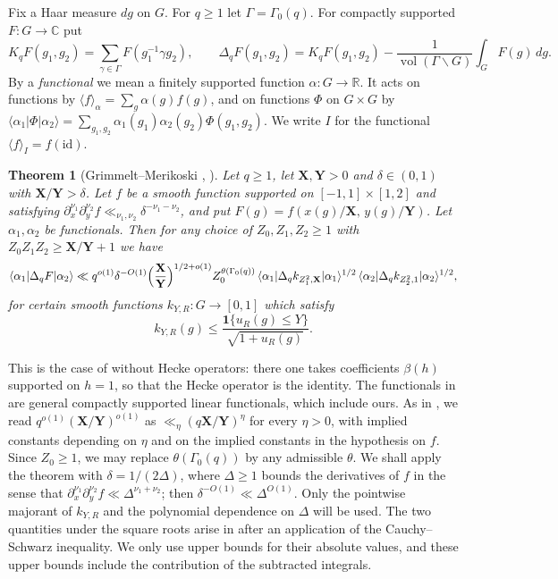 \documentclass[11pt]{amsart}
\newtheorem{theorem}{Theorem}[section]
\theoremstyle{remark}
\theoremstyle{definition}
\numberwithin{equation}{section}
\newcommand{\R}{\mathbb{R}}
\newcommand{\C}{\mathbb{C}}
\newcommand{\bX}{\mathbf{X}}
\newcommand{\bY}{\mathbf{Y}}
\newcommand{\vol}{\operatorname{vol}}
\newcommand{\one}{\mathbf{1}}
\newcommand{\br}[1]{\langle #1\rangle}
\begin{document}
Fix a Haar measure $dg$ on $G$. For $q\ge1$ let $\Gamma=\Gamma_0(q)$. For compactly supported $F:G\to\C$ put
\[
K_qF(g_1,g_2)=\sum_{\gamma\in\Gamma}F(g_1^{-1}\gamma g_2),\qquad\Delta_qF(g_1,g_2)=K_qF(g_1,g_2)-\frac{1}{\vol(\Gamma\backslash G)}\int_GF(g)\,dg.
\]
By a \emph{functional} we mean a finitely supported function $\alpha:G\to\R$. It acts on functions by $\br{f}_\alpha=\sum_g\alpha(g)f(g)$, and on functions $\Phi$ on $G\times G$ by $\br{\alpha_1|\Phi|\alpha_2}=\sum_{g_1,g_2}\alpha_1(g_1)\alpha_2(g_2)\Phi(g_1,g_2)$. We write $I$ for the functional $\br{f}_I=f(\mathrm{id})$.

\begin{theorem}[Grimmelt--Merikoski {\cite[Theorem~2.1]{GM}}, {\cite[Theorem~8.1]{GM1}}]\label{thm:GM}
Let $q\ge1$, let $\bX,\bY>0$ and $\delta\in(0,1)$ with $\bX/\bY>\delta$. Let $f$ be a smooth function supported on $[-1,1]\times[1,2]$ and satisfying $\partial_x^{\nu_1}\partial_y^{\nu_2}f\ll_{\nu_1,\nu_2}\delta^{-\nu_1-\nu_2}$, and put $F(g)=f(x(g)/\bX,\,y(g)/\bY)$. Let $\alpha_1,\alpha_2$ be functionals. Then for any choice of $Z_0,Z_1,Z_2\ge1$ with $Z_0Z_1Z_2\ge\bX/\bY+1$ we have
\[
\br{\alpha_1|\Delta_qF|\alpha_2}\ll q^{o(1)}\delta^{-O(1)}\Bigl(\frac{\bX}{\bY}\Bigr)^{1/2+o(1)}Z_0^{\theta(\Gamma_0(q))}\,\br{\alpha_1|\Delta_qk_{Z_1^2,\bX}|\alpha_1}^{1/2}\,\br{\alpha_2|\Delta_qk_{Z_2^2,1}|\alpha_2}^{1/2},
\]
for certain smooth functions $k_{Y,R}:G\to[0,1]$ which satisfy
\[
k_{Y,R}(g)\le\frac{\one\{u_R(g)\le Y\}}{\sqrt{1+u_R(g)}}.
\]
\end{theorem}

This is the case of \cite[Theorem~2.1]{GM} without Hecke operators: there one takes coefficients $\beta(h)$ supported on $h=1$, so that the Hecke operator is the identity. The functionals in \cite{GM} are general compactly supported linear functionals, which include ours. As in \cite{GM}, we read $q^{o(1)}(\bX/\bY)^{o(1)}$ as $\ll_\eta(q\bX/\bY)^{\eta}$ for every $\eta>0$, with implied constants depending on $\eta$ and on the implied constants in the hypothesis on $f$. Since $Z_0\ge1$, we may replace $\theta(\Gamma_0(q))$ by any admissible $\theta$. We shall apply the theorem with $\delta=1/(2\Delta)$, where $\Delta\ge1$ bounds the derivatives of $f$ in the sense that $\partial_x^{\nu_1}\partial_y^{\nu_2}f\ll\Delta^{\nu_1+\nu_2}$; then $\delta^{-O(1)}\ll\Delta^{O(1)}$. Only the pointwise majorant of $k_{Y,R}$ and the polynomial dependence on $\Delta$ will be used. The two quantities under the square roots arise in \cite{GM1} after an application of the Cauchy--Schwarz inequality. We only use upper bounds for their absolute values, and these upper bounds include the contribution of the subtracted integrals.
\end{document}
